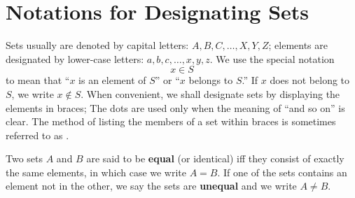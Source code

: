 \section{Notations for Designating Sets}\label{sec:1.2.2}

\begin{defn}\label{defn:1.2.2}
  Sets usually are denoted by capital letters:
  \(A, B, C, \dots, X, Y, Z\);
  elements are designated by lower-case letters:
  \(a, b, c, \dots, x, y, z\).
  We use the special notation
  \[
    x \in S
  \]
  to mean that ``\(x\) is an element of \(S\)'' or ``\(x\) belongs to \(S\).''
  If \(x\) does not belong to \(S\), we write \(x \notin S\).
  When convenient, we shall designate sets by displaying the elements in braces;
  The dots are used only when the meaning of ``and so on'' is clear.
  The method of listing the members of a set within braces is sometimes referred to as \textbf{}.
\end{defn}

\begin{defn}\label{defn:1.2.3}
  Two sets \(A\) and \(B\) are said to be \textbf{equal} (or identical) iff they consist of exactly the same elements, in which case we write \(A = B\).
  If one of the sets contains an element not in the other, we say the sets are \textbf{unequal} and we write \(A \neq B\).
\end{defn}
